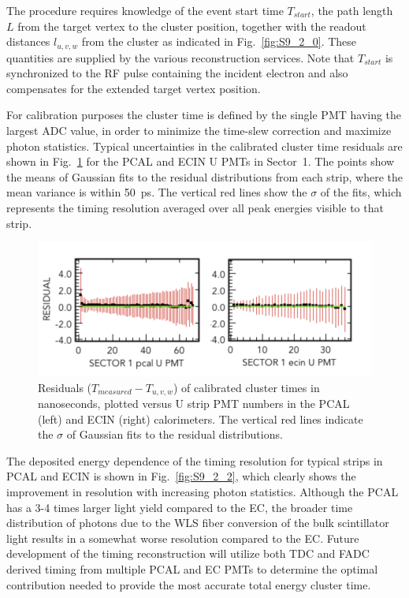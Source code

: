 The procedure requires knowledge of the event start time $T_{start}$, the path length $L$ from the target vertex
to the cluster position, together with the readout distances $l_{u,v,w}$ from the cluster as indicated in
Fig.~\ref{fig:S9_2_0}. These quantities are supplied by the various reconstruction services. Note that $T_{start}$
is synchronized to the RF pulse containing the incident electron and also compensates for the extended target
vertex position.

For calibration purposes the cluster time is defined by the single PMT having the largest ADC value, in order to
minimize the time-slew correction and maximize photon statistics. Typical uncertainties in the calibrated cluster
time residuals are shown in Fig.~\ref{fig:S9_2_1} for the PCAL and ECIN U PMTs in Sector~1. The points show the
means of Gaussian fits to the residual distributions from each strip, where the mean variance is within 50~ps. The
vertical red lines show the $\sigma$ of the fits, which represents the timing resolution averaged over all peak
energies visible to that strip.  

\begin{figure}[hbt]
\centering
\includegraphics[width=1.0\columnwidth,keepaspectratio]{img/S9_2_1.png}
\caption[]{Residuals ($T_{measured}-T_{u,v,w}$) of calibrated cluster times in nanoseconds, plotted versus U strip
  PMT numbers in the PCAL (left) and ECIN (right) calorimeters. The vertical red lines indicate the $\sigma$ of
  Gaussian fits to the residual distributions.}  
\label{fig:S9_2_1}
\end{figure}

The deposited energy dependence of the timing resolution for typical strips in PCAL and ECIN is shown in
Fig.~\ref{fig:S9_2_2}, which clearly shows the improvement in resolution with increasing photon statistics. Although
the PCAL has a 3-4 times larger light yield compared to the EC, the broader time distribution of photons due to the
WLS fiber conversion of the bulk scintillator light results in a somewhat worse resolution compared to the EC. Future
development of the timing reconstruction will utilize both TDC and FADC derived timing from multiple PCAL and EC
PMTs to determine the optimal contribution needed to provide the most accurate total energy cluster time.

